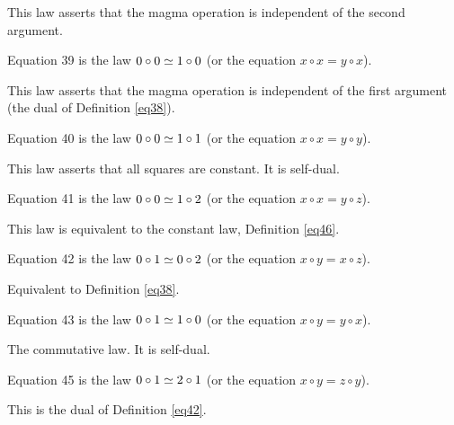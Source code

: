 This law asserts that the magma operation is independent of the second argument.

\begin{definition}[Equation 39]\label{eq39}\leanok{}  Equation 39 is the law $0 \circ 0  \simeq  1 \circ 0$ (or the equation $x \circ x = y \circ x$).
\end{definition}

This law asserts that the magma operation is independent of the first argument (the dual of Definition \ref{eq38}).

\begin{definition}[Equation 40]\label{eq40}\leanok{}  Equation 40 is the law $0 \circ 0  \simeq  1 \circ 1$ (or the equation $x \circ x = y \circ y$).
\end{definition}

This law asserts that all squares are constant. It is self-dual.

\begin{definition}[Equation 41]\label{eq41}\leanok{}  Equation 41 is the law $0 \circ 0  \simeq  1 \circ 2$ (or the equation $x \circ x = y \circ z$).
\end{definition}

This law is equivalent to the constant law, Definition \ref{eq46}.

\begin{definition}[Equation 42]\label{eq42}\leanok{}  Equation 42 is the law $0 \circ 1  \simeq  0 \circ 2$ (or the equation $x \circ y = x \circ z$).
\end{definition}

Equivalent to Definition \ref{eq38}.

\begin{definition}[Equation 43]\label{eq43}\leanok{}  Equation 43 is the law $0 \circ 1  \simeq  1 \circ 0$ (or the equation $x \circ y = y \circ x$).
\end{definition}

The commutative law. It is self-dual.

\begin{definition}[Equation 45]\label{eq45}\leanok{}  Equation 45 is the law $0 \circ 1  \simeq  2 \circ 1$ (or the equation $x \circ y = z \circ y$).
\end{definition}

This is the dual of Definition \ref{eq42}.

